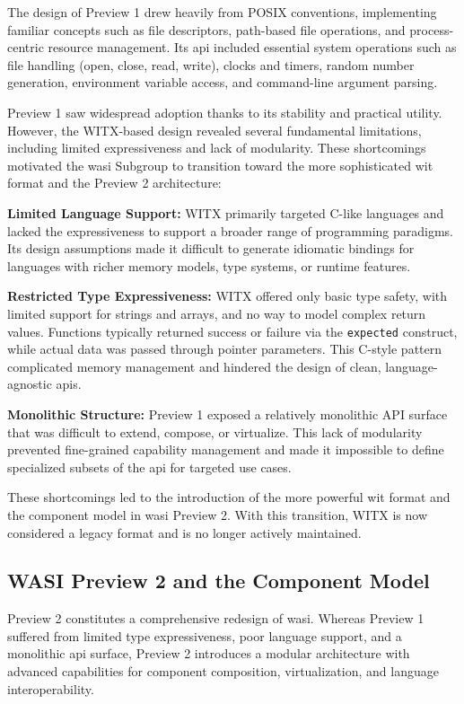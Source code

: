 The design of Preview 1 drew heavily from POSIX conventions, implementing familiar concepts such as file descriptors, path-based file operations, and process-centric resource management. Its \acrshort{api} included essential system operations such as file handling (open, close, read, write), clocks and timers, random number generation, environment variable access, and command-line argument parsing.

Preview 1 saw widespread adoption thanks to its stability and practical utility. However, the WITX-based design revealed several fundamental limitations, including limited expressiveness and lack of modularity. These shortcomings motivated the \acrshort{wasi} Subgroup to transition toward the more sophisticated \acrshort{wit} format and the Preview 2 architecture:

\textbf{Limited Language Support:} WITX primarily targeted C-like languages and lacked the expressiveness to support a broader range of programming paradigms. Its design assumptions made it difficult to generate idiomatic bindings for languages with richer memory models, type systems, or runtime features.


\textbf{Restricted Type Expressiveness:} WITX offered only basic type safety, with limited support for strings and arrays, and no way to model complex return values. Functions typically returned success or failure via the \texttt{expected} construct, while actual data was passed through pointer parameters. This C-style pattern complicated memory management and hindered the design of clean, language-agnostic \acrshort{api}s.

\textbf{Monolithic Structure:} Preview 1 exposed a relatively monolithic API surface that was difficult to extend, compose, or virtualize. This lack of modularity prevented fine-grained capability management and made it impossible to define specialized subsets of the \acrshort{api} for targeted use cases.

These shortcomings led to the introduction of the more powerful \acrshort{wit} format and the component model in \acrshort{wasi} Preview 2. With this transition, WITX is now considered a legacy format and is no longer actively maintained.

\subsection{WASI Preview 2 and the Component Model}
\label{subsec:wasi-preview2}

Preview 2 constitutes a comprehensive redesign of \acrshort{wasi}. Whereas Preview 1 suffered from limited type expressiveness, poor language support, and a monolithic \acrshort{api} surface, Preview 2 introduces a modular architecture with advanced capabilities for component composition, virtualization, and language interoperability.

